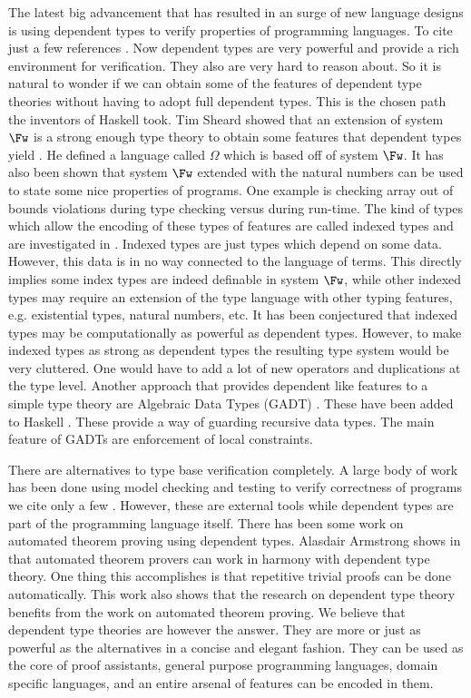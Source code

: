 \documentclass{article}
\begin{document}
The latest big advancement that has resulted in an surge of new
language designs is using dependent types to verify properties of
programming languages.  To cite just a few references
\cite{Vytiniotis:2007,Brady:2011,Mcbride:2004,Altenkirch:2003,Norell:2007,Stump:2009,Licata:2005}.
Now dependent types are very powerful and provide a rich environment
for verification.  They also are very hard to reason about.  So it is
natural to wonder if we can obtain some of the features of dependent
type theories without having to adopt full dependent types.  This is
the chosen path the inventors of Haskell took.  Tim Sheard showed that
an extension of system $\Fw$ is a strong enough type theory to obtain
some features that dependent types yield \cite{Sheard:2006}.  He
defined a language called $\Omega$ which is based off of system $\Fw$.
It has also been shown that system $\Fw$ extended with the natural
numbers can be used to state some nice properties of programs.  One
example is checking array out of bounds violations during type
checking versus during run-time.  The kind of types which allow the
encoding of these types of features are called indexed types and are
investigated in \cite{Fogarty:2007,Zenger:1997}.  Indexed types are
just types which depend on some data.  However, this data is in no way
connected to the language of terms.  This directly implies some index
types are indeed definable in system $\Fw$, while other indexed types
may require an extension of the type language with other typing
features, e.g. existential types, natural numbers, etc.  It has been
conjectured that indexed types may be computationally as powerful as
dependent types.  However, to make indexed types as strong as
dependent types the resulting type system would be very cluttered.
One would have to add a lot of new operators and duplications at the
type level.  Another approach that provides dependent like features to
a simple type theory are Algebraic Data Types (GADT) \cite{Xi:2003}.
These have been added to Haskell \cite{Jones:2006}.  These provide a
way of guarding recursive data types.  The main feature of GADTs are
enforcement of local constraints.

There are alternatives to type base verification completely.  A large
body of work has been done using model checking and testing to verify
correctness of programs we cite only a few
\cite{Andrews:2003,Aspinall:2007,Cousot:2007,Klein:2003,Yang:2006}.
However, these are external tools while dependent types are part of
the programming language itself. There has been some work on automated
theorem proving using dependent types.  Alasdair Armstrong shows in
\cite{Armstrong:2011} that automated theorem provers can work in
harmony with dependent type theory.  One thing this accomplishes is
that repetitive trivial proofs can be done automatically.  This work
also shows that the research on dependent type theory benefits from
the work on automated theorem proving.  We believe that dependent type
theories are however the answer.  They are more or just as powerful as
the alternatives in a concise and elegant fashion.  They can be used
as the core of proof assistants, general purpose programming
languages, domain specific languages, and an entire arsenal of
features can be encoded in them.
\end{document}
